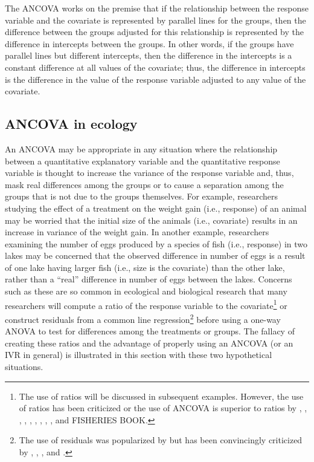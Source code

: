 \documentclass[10pt,openany]{book}\usepackage[]{graphicx}\usepackage[]{color}
\begin{document}
\vspace{-12pt}

The ANCOVA works on the premise that if the relationship between the response variable and the covariate is represented by parallel lines for the groups, then the difference between the groups adjusted for this relationship is represented by the difference in intercepts between the groups.  In other words, if the groups have parallel lines but different intercepts, then the difference in the intercepts is a constant difference at all values of the covariate; thus, the difference in intercepts is the difference in the value of the response variable adjusted to any value of the covariate.

\subsection{ANCOVA in ecology}
An ANCOVA may be appropriate in any situation where the relationship between a quantitative explanatory variable and the quantitative response variable is thought to increase the variance of the response variable and, thus, mask real differences among the groups or to cause a separation among the groups that is not due to the groups themselves.  For example, researchers studying the effect of a treatment on the weight gain (i.e., response) of an animal may be worried that the initial size of the animals (i.e., covariate) results in an increase in variance of the weight gain.  In another example, researchers examining the number of eggs produced by a species of fish (i.e., response) in two lakes may be concerned that the observed difference in number of eggs is a result of one lake having larger fish (i.e., size is the covariate) than the other lake, rather than a ``real'' difference in number of eggs between the lakes.  Concerns such as these are so common in ecological and biological research that many researchers will compute a ratio of the response variable to the covariate\footnote{The use of ratios will be discussed in subsequent examples.  However, the use of ratios has been criticized or the use of ANCOVA is superior to ratios by \cite{LeCren1951}, \cite{Atchleyetal1976}, \cite{PackardBoardman1988}, \cite{Jacksonetal1990}, \cite{RaubenheimerSimpson1992}, \cite{Albrechtetal1993}, \cite{GarciaBerthouetal1993}, \cite{Raubenheimer1995}, \cite{BeaupreDunham1995}, and FISHERIES BOOK.} or construct residuals from a common line regression\footnote{The use of residuals was popularized by \cite{Jakob1996} but has been convincingly criticized by \cite{Maxwelletal1985}, \cite{HayesShonkwiler1996}, \cite{Smith1999}, and \cite{GarciaBerthoud2001}.} before using a one-way ANOVA to test for differences among the treatments or groups.  The fallacy of creating these ratios and the advantage of properly using an ANCOVA (or an IVR in general) is illustrated in this section with these two hypothetical situations.
\end{document}
